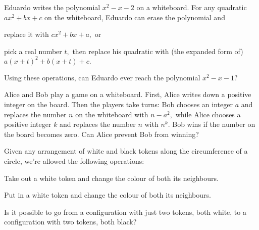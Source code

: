 \documentclass{article}
\begin{document}
\begin{prob}{6}
Eduardo writes the polynomial $x^2-x-2$ on a whiteboard. For any quadratic $ax^2+bx+c$ on the whiteboard, Eduardo can erase the polynomial and
\begin{itemize}
        \Item replace it with $cx^2 + bx + a,$ or
        
        \Item pick a real number $t,$ then replace his quadratic with (the expanded form of)
$a(x + t)^2 + b(x + t) + c.$
\end{itemize}

Using these operations, can Eduardo ever reach the polynomial $x^2 - x - 1?$
\end{prob}

\begin{req}[RMM 2019/1]{6}
Alice and Bob play a game on a whiteboard. First, Alice writes down a positive integer on the board. Then the players take turns: Bob chooses an integer $a$ and replaces the number $n$ on the whiteboard with $n-a^2,$ while Alice chooses a positive integer $k$ and replaces the number $n$ with $n^k.$ Bob wins if the number on the board becomes zero. Can Alice prevent Bob from winning?
\end{req}

\begin{prob}[]{9}
Given any arrangement of white and black tokens along the circumference of a circle, we're allowed the following operations:
    \begin{itemize}
        \Item Take out a white token and change the colour of both its neighbours.
        
        \Item Put in a white token and change the colour of both its neighbours.
    \end{itemize}
    Is it possible to go from a configuration with just two tokens, both white, to a configuration with two tokens, both black?
\end{prob}
    
\end{document}
